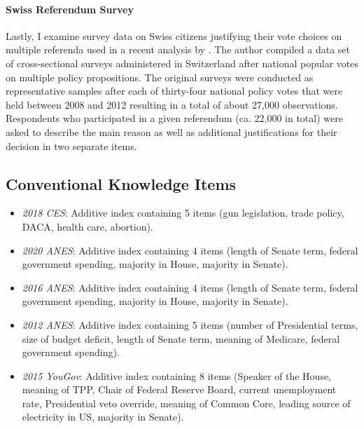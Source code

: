 \paragraph{Swiss Referendum Survey}
Lastly, I examine survey data on Swiss citizens justifying their vote choices on multiple referenda used in a recent analysis by \citet{colombo2016justifications}. The author compiled a data set of cross-sectional surveys administered in Switzerland after national popular votes on multiple policy propositions. The original surveys were conducted as representative samples after each of thirty-four national policy votes that were held between 2008 and 2012 resulting in a total of about 27,000 observations. Respondents who participated in a given referendum (ca. 22,000 in total) were asked to describe the main reason as well as additional justifications for their decision in two separate items. 


\subsection{Conventional Knowledge Items}

\begin{itemize}
	\item \textit{2018 CES}: Additive index containing 5 items (gun legislation, trade policy, DACA, health care, abortion).
	\item \textit{2020 ANES}: Additive index containing 4 items (length of Senate term, federal government spending, majority in House, majority in Senate).
	\item \textit{2016 ANES}: Additive index containing 4 items (length of Senate term, federal government spending, majority in House, majority in Senate). %
	\item \textit{2012 ANES}: Additive index containing 5 items (number of Presidential terms, size of budget deficit, length of Senate term, meaning of Medicare, federal government spending). %
	\item \textit{2015 YouGov}: Additive index containing 8 items (Speaker of the House, meaning of TPP, Chair of Federal Reserve Board, current unemployment rate, Presidential veto override, meaning of Common Core, leading source of electricity in US, majority in Senate). %
\end{itemize}

